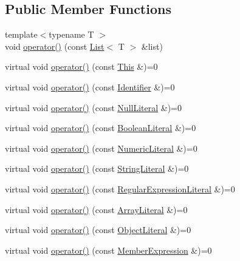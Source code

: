 \subsection*{Public Member Functions}
\begin{DoxyCompactItemize}
\item 
{\footnotesize template$<$typename T $>$ }\\void \hyperlink{structast_1_1_visitor_a1e9e80b062c53988c8fdfdcdd1791add}{operator()} (const \hyperlink{structast_1_1_list}{List}$<$ T $>$ \&list)
\item 
virtual void \hyperlink{structast_1_1_visitor_a1a830145fdaf0d8fc5edf41e397edc9b}{operator()} (const \hyperlink{structast_1_1_this}{This} \&)=0
\item 
virtual void \hyperlink{structast_1_1_visitor_ad1372b7807cc1bdaf7d697a7ea716a5b}{operator()} (const \hyperlink{structast_1_1_identifier}{Identifier} \&)=0
\item 
virtual void \hyperlink{structast_1_1_visitor_aa37bac4fca4c624aa2491bfaa61fdd1b}{operator()} (const \hyperlink{structast_1_1_null_literal}{Null\+Literal} \&)=0
\item 
virtual void \hyperlink{structast_1_1_visitor_a972ca7fe82a7db9f414a0f1077c28c98}{operator()} (const \hyperlink{structast_1_1_boolean_literal}{Boolean\+Literal} \&)=0
\item 
virtual void \hyperlink{structast_1_1_visitor_ac2a7315c6c24a9b8ca4f9710b7d2a147}{operator()} (const \hyperlink{structast_1_1_numeric_literal}{Numeric\+Literal} \&)=0
\item 
virtual void \hyperlink{structast_1_1_visitor_a076a577c22acd9932a8a6ff7e943c3ea}{operator()} (const \hyperlink{structast_1_1_string_literal}{String\+Literal} \&)=0
\item 
virtual void \hyperlink{structast_1_1_visitor_a108c87a2e0c3ce02b240f4b44f29e4da}{operator()} (const \hyperlink{structast_1_1_regular_expression_literal}{Regular\+Expression\+Literal} \&)=0
\item 
virtual void \hyperlink{structast_1_1_visitor_a7f4f8a617d579f2bf5ba6a90af5c633f}{operator()} (const \hyperlink{structast_1_1_array_literal}{Array\+Literal} \&)=0
\item 
virtual void \hyperlink{structast_1_1_visitor_a085aff35767efc46f316028fbe4ec0de}{operator()} (const \hyperlink{structast_1_1_object_literal}{Object\+Literal} \&)=0
\item 
virtual void \hyperlink{structast_1_1_visitor_a759a1d5ba4258c46dab848a198b03295}{operator()} (const \hyperlink{structast_1_1_member_expression}{Member\+Expression} \&)=0

\end{DoxyCompactItemize}

